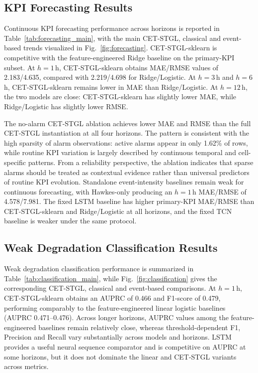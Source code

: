 \subsection{KPI Forecasting Results}
\label{sec:forecasting_results}
\label{sec:results}

Continuous KPI forecasting performance across horizons is reported in Table~\ref{tab:forecasting_main}, with the main CET-STGL, classical and event-based trends visualized in Fig.~\ref{fig:forecasting}. CET-STGL-sklearn is competitive with the feature-engineered Ridge baseline on the primary-KPI subset. At $h=1$\,h, CET-STGL-sklearn obtains MAE/RMSE values of 2.183/4.635, compared with 2.219/4.698 for Ridge/Logistic. At $h=3$\,h and $h=6$\,h, CET-STGL-sklearn remains lower in MAE than Ridge/Logistic. At $h=12$\,h, the two models are close: CET-STGL-sklearn has slightly lower MAE, while Ridge/Logistic has slightly lower RMSE.

The no-alarm CET-STGL ablation achieves lower MAE and RMSE than the full CET-STGL instantiation at all four horizons. The pattern is consistent with the high sparsity of alarm observations: active alarms appear in only 1.62\% of rows, while routine KPI variation is largely described by continuous temporal and cell-specific patterns. From a reliability perspective, the ablation indicates that sparse alarms should be treated as contextual evidence rather than universal predictors of routine KPI evolution. Standalone event-intensity baselines remain weak for continuous forecasting, with Hawkes-only producing an $h=1$\,h MAE/RMSE of 4.578/7.981. The fixed LSTM baseline has higher primary-KPI MAE/RMSE than CET-STGL-sklearn and Ridge/Logistic at all horizons, and the fixed TCN baseline is weaker under the same protocol.



\subsection{Weak Degradation Classification Results}
\label{sec:classification_results}

Weak degradation classification performance is summarized in Table~\ref{tab:classification_main}, while Fig.~\ref{fig:classification} gives the corresponding CET-STGL, classical and event-based comparisons. At $h=1$\,h, CET-STGL-sklearn obtains an AUPRC of 0.466 and F1-score of 0.479, performing comparably to the feature-engineered linear logistic baselines (AUPRC 0.471--0.476). Across longer horizons, AUPRC values among the feature-engineered baselines remain relatively close, whereas threshold-dependent F1, Precision and Recall vary substantially across models and horizons. LSTM provides a useful neural sequence comparator and is competitive on AUPRC at some horizons, but it does not dominate the linear and CET-STGL variants across metrics.

